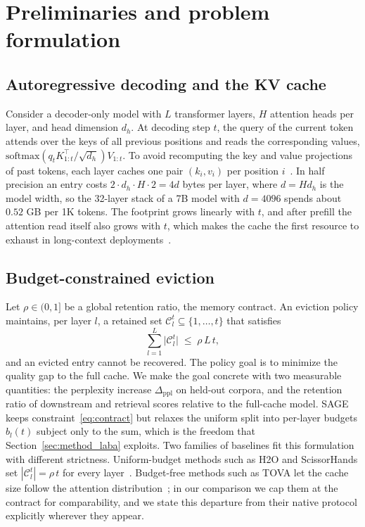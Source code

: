 \section{Preliminaries and problem formulation}\label{sec:prelim}

\subsection{Autoregressive decoding and the KV cache}

Consider a decoder-only model with $L$ transformer layers, $H$ attention
heads per layer, and head dimension $d_h$. At decoding step $t$, the
query of the current token attends over the keys of all previous
positions and reads the corresponding values,
$\mathrm{softmax}(q_t K_{1:t}^{\top}/\sqrt{d_h}) V_{1:t}$. To avoid
recomputing the key and value projections of past tokens, each layer
caches one pair $(k_i, v_i)$ per position
$i$~\cite{shazeer2019fast,vaswani2017attention}. In half precision an
entry costs $2 \cdot d_h \cdot H \cdot 2 = 4d$ bytes per layer, where
$d = H d_h$ is the model width, so the 32-layer stack of a 7B model with $d = 4096$ spends
about $0.52$ GB per 1K tokens. The footprint grows
linearly with $t$, and after prefill the attention read itself also
grows with $t$, which makes the cache the first resource to exhaust in
long-context deployments~\cite{pope2023efficiently}.

\subsection{Budget-constrained eviction}

Let $\rho \in (0,1]$ be a global retention ratio, the memory contract.
An eviction policy maintains, per layer $l$, a retained set
$\mathcal{C}_l^{t} \subseteq \{1,\dots,t\}$ that satisfies
\begin{equation}\label{eq:contract}
  \sum_{l=1}^{L} \bigl|\mathcal{C}_l^{t}\bigr|
  \;\le\; \rho\, L\, t,
\end{equation}
and an evicted entry cannot be recovered. The policy goal is to
minimize the quality gap to the full cache. We make the goal concrete
with two measurable quantities: the perplexity increase
$\Delta_{\mathrm{ppl}}$ on held-out corpora, and the retention ratio of
downstream and retrieval scores relative to the full-cache model.
SAGE keeps constraint~\eqref{eq:contract} but relaxes the uniform split
into per-layer budgets $b_l(t)$ subject only to the sum, which is the
freedom that Section~\ref{sec:method_laba} exploits. Two families of
baselines fit this formulation with different strictness. Uniform-budget
methods such as H2O and ScissorHands set
$|\mathcal{C}_l^{t}| = \rho\, t$ for every
layer~\cite{zhang2023h2o,liu2023scissorhands}. Budget-free methods
such as TOVA let the cache size follow the attention
distribution~\cite{oren2024tova}; in our comparison
we cap them at the contract for comparability, and we state this
departure from their native protocol explicitly wherever they
appear.

